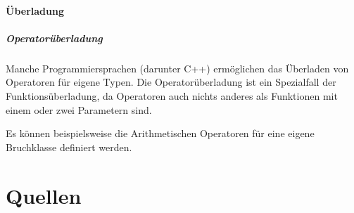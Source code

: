 			\paragraph{Überladung}
				\subparagraph{Operatorüberladung}
					Manche Programmiersprachen (darunter C++) ermöglichen das Überladen von Operatoren für eigene Typen. Die
					Operatorüberladung ist ein Spezialfall der Funktionsüberladung, da Operatoren auch nichts anderes als
					Funktionen mit einem oder zwei Parametern sind.
					
					Es können beispielsweise die Arithmetischen Operatoren für eine eigene Bruchklasse definiert werden.
					
\newpage
\section{Quellen}
	
	
